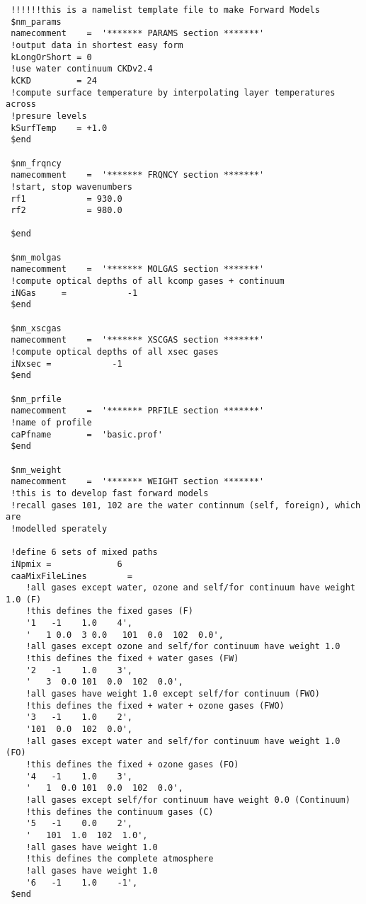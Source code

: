 \documentclass[11pt]{article}
\begin{document}
\begin{verbatim}
 !!!!!!this is a namelist template file to make Forward Models
 $nm_params
 namecomment    =  '******* PARAMS section *******'
 !output data in shortest easy form
 kLongOrShort = 0             
 !use water continuum CKDv2.4
 kCKD         = 24
 !compute surface temperature by interpolating layer temperatures across
 !presure levels
 kSurfTemp    = +1.0
 $end

 $nm_frqncy
 namecomment    =  '******* FRQNCY section *******'
 !start, stop wavenumbers
 rf1            = 930.0
 rf2            = 980.0

 $end

 $nm_molgas
 namecomment    =  '******* MOLGAS section *******'
 !compute optical depths of all kcomp gases + continuum
 iNGas     =            -1
 $end

 $nm_xscgas
 namecomment    =  '******* XSCGAS section *******'
 !compute optical depths of all xsec gases
 iNxsec =            -1
 $end

 $nm_prfile
 namecomment    =  '******* PRFILE section *******'
 !name of profile
 caPfname       =  'basic.prof'
 $end

 $nm_weight
 namecomment    =  '******* WEIGHT section *******'
 !this is to develop fast forward models
 !recall gases 101, 102 are the water continnum (self, foreign), which are
 !modelled sperately

 !define 6 sets of mixed paths
 iNpmix =             6
 caaMixFileLines        = 
    !all gases except water, ozone and self/for continuum have weight 1.0 (F)
    !this defines the fixed gases (F)
    '1   -1    1.0    4',
    '   1 0.0  3 0.0   101  0.0  102  0.0',
    !all gases except ozone and self/for continuum have weight 1.0
    !this defines the fixed + water gases (FW)
    '2   -1    1.0    3',
    '   3  0.0 101  0.0  102  0.0',
    !all gases have weight 1.0 except self/for continuum (FWO)
    !this defines the fixed + water + ozone gases (FWO)
    '3   -1    1.0    2',
    '101  0.0  102  0.0',
    !all gases except water and self/for continuum have weight 1.0 (FO)
    !this defines the fixed + ozone gases (FO)
    '4   -1    1.0    3',
    '   1  0.0 101  0.0  102  0.0',
    !all gases except self/for continuum have weight 0.0 (Continuum)
    !this defines the continuum gases (C)
    '5   -1    0.0    2',
    '   101  1.0  102  1.0',
    !all gases have weight 1.0
    !this defines the complete atmosphere
    !all gases have weight 1.0 
    '6   -1    1.0    -1',
 $end


\end{verbatim}
\end{document}
